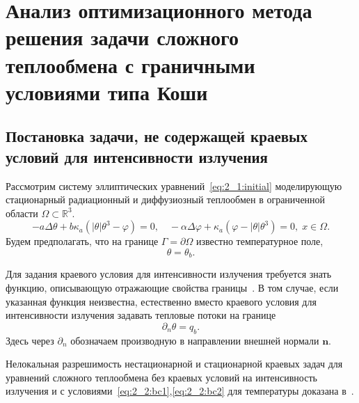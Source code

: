 \section{Анализ оптимизационного метода решения
задачи сложного теплообмена с граничными условиями типа
Коши}\label{sec:ch2/sec2}

\subsection{Постановка задачи, не содержащей краевых условий для интенсивности излучения}\label{subsec:ch2/sec2/subsec1}
Рассмотрим систему эллиптических уравнений~\eqref{eq:2_1:initial}
моделирующую стационарный радиационный и диффузиозный теплообмен в
ограниченной области $\Omega \subset \mathbb{R}^3$.
\begin{equation}
    \label{eq:2_2:eq1}
    - a\Delta\theta + b\kappa_a(|\theta|\theta^3- \varphi)=0, \quad
    -\alpha \Delta \varphi
    + \kappa_a(\varphi-|\theta|\theta^3)=0,\; x\in\Omega.
\end{equation}
Будем предполагать, что на границе $\Gamma = \partial \Omega$ известно температурное поле,
\begin{equation}
    \label{eq:2_2:bc1} \theta = \theta_b.
\end{equation}


Для задания краевого условия для интенсивности излучения
требуется знать функцию, описывающую отражающие свойства границы~\cite{JVM-14}.
В том случае, если указанная функция неизвестна, естественно вместо
краевого условия для интенсивности излучения задавать тепловые потоки на границе
\begin{equation}
    \label{eq:2_2:bc2}
    \partial_n\theta = q_b.
\end{equation}
Здесь через $\partial_n$ обозначаем производную в направлении
внешней нормали $\mathbf n$.

Нелокальная разрешимость нестационарной и
стационарной краевых задач для уравнений сложного теплообмена
без краевых условий на интенсивность излучения и
с условиями~\eqref{eq:2_2:bc1},\eqref{eq:2_2:bc2}
для температуры доказана в~\cite{Chebotarev2019Problem,CMMP20}.

